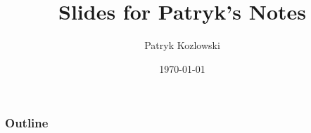 \documentclass{beamer}
\title{Slides for Patryk's Notes}
\author{Patryk Kozlowski}
\date{\today}
\begin{document}
\begin{frame}
    \titlepage
\end{frame}
\begin{frame}
  \frametitle{Outline}
  \tableofcontents
\end{frame}
% 
% 
% 
% 
% 
% 
% 
% 

\end{document}
